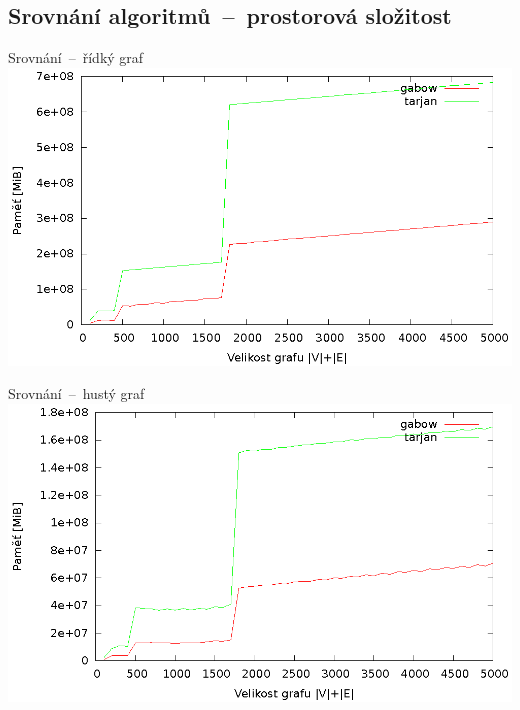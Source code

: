 \documentclass{beamer}
\begin{document}
\subsection{Srovnání algoritmů\ --\ prostorová složitost}
\begin{frame}{Srovnání\ --\ řídký graf}
  \includegraphics[width=\textwidth,height=\textheight,keepaspectratio]{0_2_memory}
\end{frame}
\begin{frame}{Srovnání\ --\ hustý graf}
  \includegraphics[width=\textwidth,height=\textheight,keepaspectratio]{0_8_memory}
\end{frame}
\end{document}
